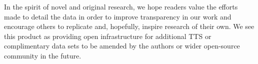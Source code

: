 \documentclass[Royal,times,sageh]{sagej}
\begin{document}
In the spirit of novel and original research, we hope readers value the
efforts made to detail the data in order to improve transparency in our
work and encourage others to replicate and, hopefully, inspire research
of their own. We see this product as providing open infrastructure for
additional TTS or complimentary data sets to be amended by the authors
or wider open-source community in the future.



\end{document}
